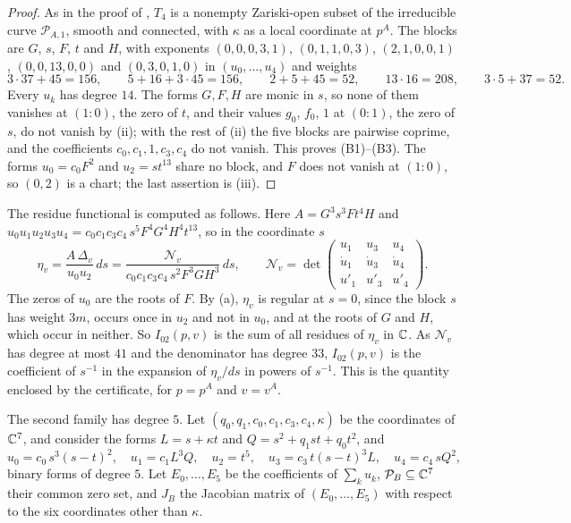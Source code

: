 \begin{proof}
As in the proof of , $T_{4}$ is a nonempty Zariski-open
subset of the irreducible curve $\mathcal P_{A,1}$, smooth and connected,
with $\kappa$ as a local coordinate at $p^{A}$. The blocks are $G$, $s$,
$F$, $t$ and $H$, with exponents $(0,0,0,3,1)$, $(0,1,1,0,3)$,
$(2,1,0,0,1)$, $(0,0,13,0,0)$ and $(0,3,0,1,0)$ in $(u_{0},\dots,u_{4})$ and
weights
\[
  3\cdot37+45=156,\qquad 5+16+3\cdot45=156,\qquad 2+5+45=52,\qquad
  13\cdot16=208,\qquad 3\cdot5+37=52 .
\]
Every $u_{k}$ has degree $14$. The forms $G,F,H$ are monic in $s$, so none
of them vanishes at $(1:0)$, the zero of $t$, and their values $g_{0}$,
$f_{0}$, $1$ at $(0:1)$, the zero of $s$, do not vanish by (ii); with the
rest of (ii) the five blocks are pairwise coprime, and the coefficients
$c_{0},c_{1},1,c_{3},c_{4}$ do not vanish. This proves (B1)--(B3). The forms
$u_{0}=c_{0}F^{2}$ and $u_{2}=st^{13}$ share no block, and $F$ does not
vanish at $(1:0)$, so $(0,2)$ is a chart; the last assertion is (iii).
\end{proof}

The residue functional is computed as follows. Here $A=G^{3}s^{3}Ft^{4}H$
and $u_{0}u_{1}u_{2}u_{3}u_{4}=c_{0}c_{1}c_{3}c_{4}\,s^{5}F^{4}G^{4}H^{4}
t^{13}$, so in the coordinate $s$
\[
  \eta_{v}=\frac{A\,\Delta_{v}}{u_{0}u_{2}}\,ds=\frac{\mathcal N_{v}}
  {c_{0}c_{1}c_{3}c_{4}\,s^{2}F^{3}GH^{3}}\,ds,\qquad\mathcal N_{v}=
  \det\begin{pmatrix}u_{1}&u_{3}&u_{4}\\ \dot u_{1}&\dot u_{3}&\dot u_{4}\\
  u'_{1}&u'_{3}&u'_{4}\end{pmatrix}.
\]
The zeros of $u_{0}$ are the roots of $F$. By (a),
$\eta_{v}$ is regular at $s=0$, since the block $s$ has weight $3m$, occurs
once in $u_{2}$ and not in $u_{0}$, and at the roots of $G$ and $H$, which
occur in neither. So $I_{02}(p,v)$ is the sum of all residues of $\eta_{v}$
in $\mathbb{C}$. As $\mathcal N_{v}$ has degree at most $41$ and the denominator
has degree $33$, $I_{02}(p,v)$ is the coefficient of $s^{-1}$ in the
expansion of $\eta_{v}/ds$ in powers of $s^{-1}$. This is the quantity
enclosed by the certificate, for $p=p^{A}$ and $v=v^{A}$.

The second family has degree $5$. Let $(q_{0},q_{1},c_{0},c_{1},c_{3},c_{4},
\kappa)$ be the coordinates of $\mathbb{C}^{7}$, and consider the forms
$L=s+\kappa t$ and $Q=s^{2}+q_{1}st+q_{0}t^{2}$, and
\[
  u_{0}=c_{0}\,s^{3}(s-t)^{2},\quad u_{1}=c_{1}L^{3}Q,\quad u_{2}=t^{5},\quad
  u_{3}=c_{3}\,t(s-t)^{3}L,\quad u_{4}=c_{4}\,sQ^{2},
\]
binary forms of degree $5$. Let $E_{0},\dots,E_{5}$ be the coefficients of
$\sum_{k}u_{k}$, $\mathcal P_{B}\subseteq\mathbb{C}^{7}$ their common zero set, and
$J_{B}$ the Jacobian matrix of $(E_{0},\dots,E_{5})$ with respect to the six
coordinates other than $\kappa$.

